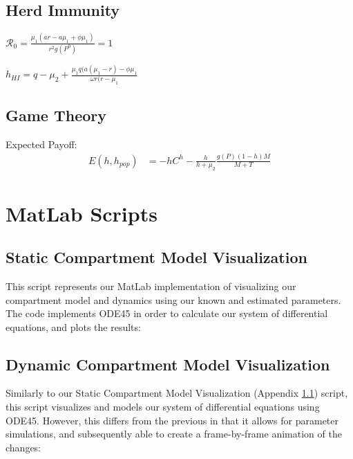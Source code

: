 \documentclass[12pt]{article}
\begin{document}
    \subsection{Herd Immunity}
    $\mathscr{R}_{0} = \frac{\mu_{1}(a r - a\mu_{1} + \phi \mu_{1})}{r^{2}g(P^{0})} = 1$
    
    $h_{HI} = q - \mu_{2} + \frac{\mu_{1}q(a(\mu_{1}-r)-\phi \mu_{1}}{\omega r (r-\mu_{1}}$
    
    \subsection{Game Theory}
    Expected Payoff: 
    \begin{align*}
        E (h, h_{pop}) &= -hC^{h} - \frac{h}{h+\mu_{2}} \frac{g(P)(1-h)M}{M+T}
    \end{align*}
    
    \section{MatLab Scripts}
        \subsection{Static Compartment Model Visualization}
        \label{appendix:B1}
        This script represents our MatLab implementation of visualizing our compartment model and dynamics using our known and estimated parameters. The code implements ODE45 in order to calculate our system of differential equations, and plots the results:
        \begin{center}
            
        \end{center}
        
        \subsection{Dynamic Compartment Model Visualization}
        \label{appendix:B2}
        Similarly to our Static Compartment Model Visualization (Appendix \ref{appendix:B1}) script, this script visualizes and models our system of differential equations using ODE45. However, this differs from the previous in that it allows for parameter simulations, and subsequently able to create a frame-by-frame animation of the changes:
        \begin{center}
            
        \end{center}
        
\end{document}
